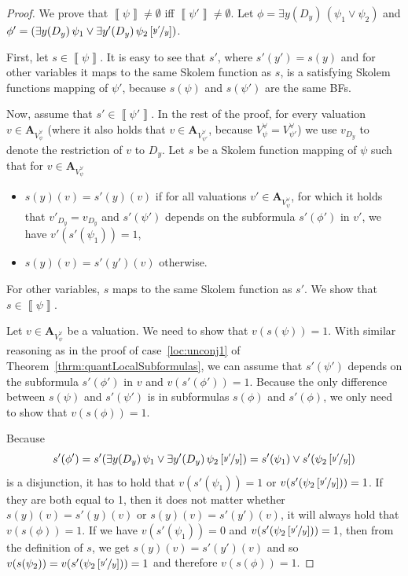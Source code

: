 \documentclass[
  digital, %
  color,
  twoside, %
  table,   %
  nolof,     %
  nolot,     %
]{fithesis3}
\theoremstyle{definition}
\theoremstyle{remark}
\newcommand{\seman}[1]{\left\llbracket {#1} \right\rrbracket}
\newcommand{\substitute}[2]{\left[ \nicefrac{#2}{#1} \right]}
\newcommand{\valtns}[1]{\mathbf{A}_{#1}}
\newcommand{\uvars}[1]{V_{#1}^{\forall}}
\newcommand{\itholds}{\,}
\begin{document}
\begin{proof}
  We prove that $\seman{\psi} \not= \emptyset$ iff $\seman{\psi'} \not= \emptyset$. Let $\phi = \exists y(D_y) \itholds (\psi_1 \lor \psi_2)$ and $\phi' = (\exists y(D_y) \itholds \psi_1 \lor \exists y'(D_y) \itholds \psi_2\substitute{y}{y'})$. 
  
  First, let $s \in \seman{\psi}$. It is easy to see that $s'$, where $s'(y') = s(y)$ and for other variables it maps to the same Skolem function as $s$, is a satisfying Skolem functions mapping of $\psi'$, because $s(\psi)$ and $s(\psi')$ are the same BFs.
  
  Now, assume that $s' \in \seman{\psi'}$. In the rest of the proof, for every valuation $v \in \valtns{\uvars{\psi}}$ (where it also holds that $v \in \valtns{\uvars{\psi'}}$, because $\uvars{\psi} = \uvars{\psi'}$) we use $v_{D_y}$ to denote the restriction of $v$ to $D_y$. Let $s$ be a Skolem function mapping of $\psi$ such that for $v \in \valtns{\uvars{\psi}}$ 
  \begin{itemize}
      \item $s(y)(v) = s'(y)(v)$ if for all valuations $v' \in \valtns{\uvars{\psi}}$, for which it holds that $v'_{D_y} = v_{D_y}$ and $s'(\psi')$ depends on the subformula $s'(\phi')$ in $v'$, we have $v'(s'(\psi_1)) = 1$,
      \item $s(y)(v) = s'(y')(v)$ otherwise.
  \end{itemize}
  For other variables, $s$ maps to the same Skolem function as $s'$. We show that $s \in \seman{\psi}$.
  
  Let $v \in \valtns{\uvars{\psi}}$ be a valuation. We need to show that $v(s(\psi)) = 1$. With similar reasoning as in the proof of case~\eqref{loc:unconj1} of Theorem~\ref{thrm:quantLocalSubformulas}, we can assume that $s'(\psi')$ depends on the subformula $s'(\phi')$ in $v$ and $v(s'(\phi')) = 1$. Because the only difference between $s(\psi)$ and $s'(\psi')$ is in subformulas $s(\phi)$ and $s'(\phi)$, we only need to show that $v(s(\phi)) = 1$.
  
  Because 
  \[s'(\phi') = s'(\exists y(D_y) \itholds \psi_1 \lor \exists y'(D_y) \itholds \psi_2\substitute{y}{y'}) = s'(\psi_1) \lor s'(\psi_2\substitute{y}{y'})\] is a disjunction, it has to hold that $v(s'(\psi_1)) = 1$ or $v(s'(\psi_2\substitute{y}{y'})) = 1$.
  If they are both equal to 1, then it does not matter whether $s(y)(v) = s'(y)(v)$ or $s(y)(v) = s'(y')(v)$, it will always hold that $v(s(\phi)) = 1$.
  If we have $v(s'(\psi_1)) = 0$ and $v(s'(\psi_2\substitute{y}{y'})) = 1$, then from the definition of $s$, we get $s(y)(v) = s'(y')(v)$ and so $v(s(\psi_2)) = v(s'(\psi_2\substitute{y}{y'})) = 1$ and therefore $v(s(\phi)) = 1$.
  

\end{proof}
\end{document}
